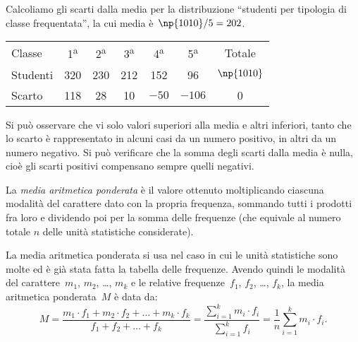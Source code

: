 \begin{exrig}
 \begin{esempio}
Calcoliamo gli scarti dalla media per la distribuzione ``studenti per tipologia di classe frequentata'', la cui media è~$\np{1010}/5 = 202$.
\begin{center}
\begin{tabular}{l*{6}{c}}
\toprule
Classe & 1\textsuperscript{a} & 2\textsuperscript{a} & 3\textsuperscript{a} & 4\textsuperscript{a} & 5\textsuperscript{a} & Totale\\
Studenti & 320& 230& 212& 152& 96& $\np{1010}$ \\
Scarto & 118 & 28 & 10 & $-50$ & $-106$ & 0\\
\bottomrule
\end{tabular}
\end{center}
Si può osservare che vi solo valori superiori alla media e altri inferiori, tanto che lo scarto è rappresentato in
alcuni casi da un numero positivo, in altri da un numero negativo. Si può verificare che la somma degli scarti dalla media è nulla,
cioè gli scarti positivi compensano sempre quelli negativi.
 \end{esempio}
\end{exrig}


\begin{definizione}
La \emph{media aritmetica ponderata} è il valore ottenuto moltiplicando ciascuna modalità del carattere
dato con la propria frequenza, sommando tutti i prodotti fra loro e dividendo poi per la somma delle frequenze
(che equivale al numero totale $n$ delle unità statistiche considerate).
\end{definizione}

La media aritmetica ponderata si usa nel caso in cui le unità statistiche sono molte ed è già stata fatta la tabella delle frequenze. Avendo quindi le modalità del carattere~$m_1$, $m_2$, \ldots, $m_k$ e le relative frequenze~$f_1$, $f_2$, \ldots, $f_k$, la media aritmetica ponderata~$M$ è data da:
\begin{equation*}
M=\frac{m_1\cdot f_1+m_2\cdot f_2+ \dots +m_k\cdot f_k}{f_1+f_2+ \dots +f_k}=\frac{\sum_{i=1}^k m_i\cdot f_i}{\sum_{i=1}^k f_i}=\frac{1}{n}\sum_{i=1}^k m_i\cdot f_i.
\end{equation*}

